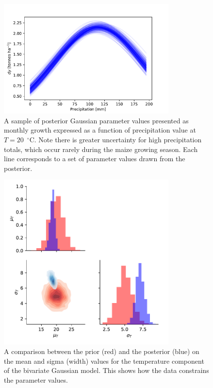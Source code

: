 \documentclass[12pt]{iopart}
\begin{document}
\begin{figure}
\centering
\includegraphics[width=0.8\textwidth]{./figures/2d_Gauss_precip_post_sample_growth_curve}
\caption{\label{fig:2d_Gauss_precip_post_sample_growth_curve} A sample of posterior Gaussian parameter values presented as monthly growth expressed as a function of precipitation value at $T = 20$~$^\circ$C. Note there is greater uncertainty for high precipitation totals, which occur rarely during the maize growing season. Each line corresponds to a set of parameter values drawn from the posterior.}
\end{figure}

\begin{figure}
\centering
\includegraphics[width=0.8\textwidth]{./figures/2d_Gauss_prior_vs_post_temp_mean_vs_sigma}
\caption{\label{fig:2d_Gauss_prior_vs_post_temp_mean_vs_sigma} A comparison between the prior (red) and the posterior (blue) on the mean and sigma (width) values for the temperature component of the bivariate Gaussian model. This shows how the data constrains the parameter values.}
\end{figure}
\end{document}
